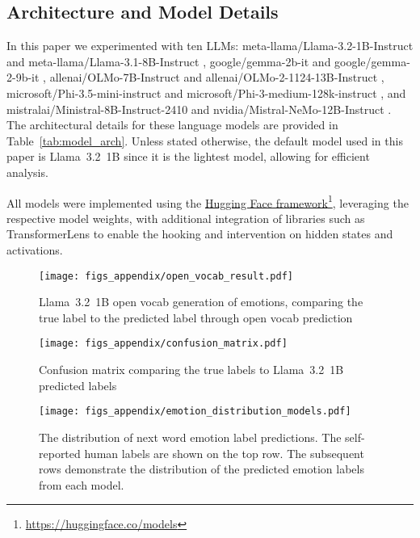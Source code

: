 \subsection{Architecture and Model Details} \label{app:arch}

In this paper we experimented with ten LLMs: meta-llama/Llama-3.2-1B-Instruct and meta-llama/Llama-3.1-8B-Instruct \cite{llama3}, google/gemma-2b-it and google/gemma-2-9b-it \cite{gemma2}, allenai/OLMo-7B-Instruct and allenai/OLMo-2-1124-13B-Instruct \cite{olmo2}, microsoft/Phi-3.5-mini-instruct and microsoft/Phi-3-medium-128k-instruct \cite{abdin2024phi}, and mistralai/Ministral-8B-Instruct-2410 and nvidia/Mistral-NeMo-12B-Instruct \cite{mistral2024nemo}.  The architectural details for these language models are provided in Table~\ref{tab:model_arch}. Unless stated otherwise, the default model used in this paper is Llama~3.2~1B since it is the lightest model, allowing for efficient analysis.

All models were implemented using the \href{https://huggingface.co/models}{Hugging Face framework}\footnote{\url{https://huggingface.co/models}}, leveraging the respective model weights, with additional integration of libraries such as TransformerLens \cite{nandatransformerlens2022} to enable the hooking and intervention on hidden states and activations.

\begin{figure}[ht]
    \centering
    \texttt{[image: figs\_appendix/open\_vocab\_result.pdf]}
  \caption{Llama~3.2~1B open vocab generation of emotions, comparing the true label to the predicted label through open vocab prediction}
  \label{fig:Llama1B_open_vocab}
\end{figure} 

\begin{figure}[ht]
    \centering
    \texttt{[image: figs\_appendix/confusion\_matrix.pdf]}
  \caption{Confusion matrix comparing the true labels to Llama~3.2~1B predicted labels}
  \label{fig:Llama1B_confusion_matrix}
\end{figure} 

\begin{figure*}[t]
    \centering
    \texttt{[image: figs\_appendix/emotion\_distribution\_models.pdf]}
  \caption{The distribution of next word emotion label predictions. The self-reported human labels are shown on the top row. The subsequent rows demonstrate the distribution of the predicted emotion labels from each model.}
  \label{fig:models_pred_distribution}
\end{figure*} 

